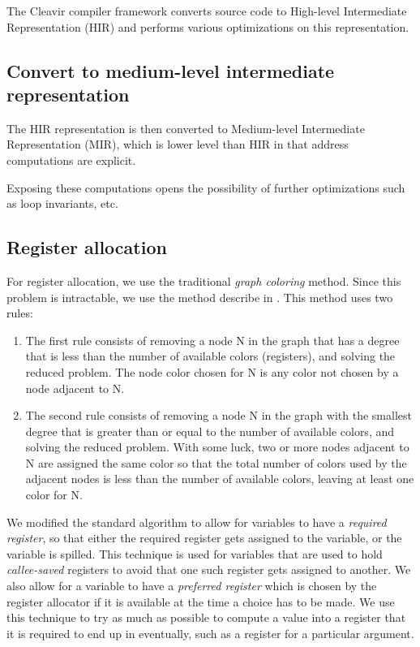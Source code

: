 The Cleavir compiler framework converts source code to High-level
Intermediate Representation (HIR) and performs various optimizations
on this representation.

\subsection{Convert to medium-level intermediate representation}

The HIR representation is then converted to Medium-level Intermediate
Representation (MIR), which is lower level than HIR in that address
computations are explicit.

Exposing these computations opens the possibility of further
optimizations such as loop invariants, etc.

\subsection{Register allocation}

For register allocation, we use the traditional \emph{graph coloring}
method.  Since this problem is intractable, we use the method describe
in \cite{Muchnick:1998:ACD:286076}.  This method uses two rules:

\begin{enumerate}
\item The first rule consists of removing a node N in the graph that
  has a degree that is less than the number of available colors
  (registers), and solving the reduced problem.  The node color chosen
  for N is any color not chosen by a node adjacent to N.
\item The second rule consists of removing a node N in the graph with
  the smallest degree that is greater than or equal to the number of
  available colors, and solving the reduced problem.  With some luck,
  two or more nodes adjacent to N are assigned the same color so that
  the total number of colors used by the adjacent nodes is less than
  the number of available colors, leaving at least one color for N.
\end{enumerate}

We modified the standard algorithm to allow for variables to have a
\emph{required register}, so that either the required register gets
assigned to the variable, or the variable is spilled.  This technique
is used for variables that are used to hold \emph{callee-saved}
registers to avoid that one such register gets assigned to another.
We also allow for a variable to have a \emph{preferred register} which
is chosen by the register allocator if it is available at the time a
choice has to be made.  We use this technique to try as much as
possible to compute a value into a register that it is required to end
up in eventually, such as a register for a particular argument.%

